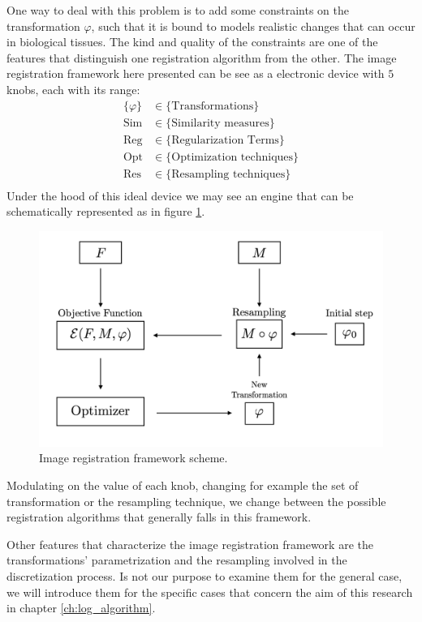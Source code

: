 One way to deal with this problem is to add some constraints on the transformation $\varphi$, such that it is bound to models realistic changes that can occur in biological tissues. The kind and quality of the constraints are one of the features that distinguish one registration algorithm from the other. 
The image registration framework here presented can be see as a electronic device with $5$ knobs, each with its range:
\begin{align*}
\{  \varphi \} &\in \{ \text{Transformations}\}\\
\text{Sim} &\in \{ \text{Similarity measures}\}\\
\text{Reg} &\in \{ \text{Regularization Terms}\}\\
\text{Opt} &\in \{ \text{Optimization techniques}\}\\
\text{Res} &\in \{ \text{Resampling techniques}\}\\
\end{align*}
Under the hood of this ideal device we may see an engine that can be schematically represented as in figure \ref{fig:iterative_algorithm_scheme}.
\begin{figure}[!ht]
	\centering
	\includegraphics[scale=0.235]{figures/iterative_algorithm.png}
	\caption{Image registration framework scheme.}
	\label{fig:iterative_algorithm_scheme}
\end{figure}

\noindent
Modulating on the value of each knob, changing for example the set of transformation or the resampling technique, we change between the possible registration algorithms that generally falls in this framework.

Other features that characterize the image registration framework are the transformations' parametrization and the resampling involved in the discretization process. Is not our purpose to examine them for the general case, we will introduce them for the specific cases that concern the aim of this research in chapter \ref{ch:log_algorithm}.


